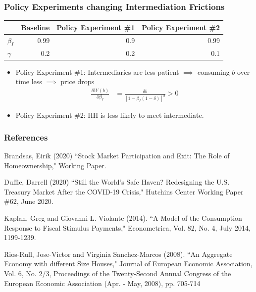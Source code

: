 \documentclass{beamer}
\begin{document}
\begin{frame}
\frametitle{Policy Experiments changing Intermediation Frictions}

\begin{center}
\begin{tabular}{ l | r r r }
& Baseline & Policy Experiment \#1 & Policy Experiment \#2\\ 
\hline 
$\beta_I$ & 0.99 & 0.9 & 0.99 \\
$\gamma$  & 0.2 & 0.2 & 0.1 \\ 
\end{tabular}
\end{center}

\bigskip


\begin{itemize}[<+->]
\item Policy Experiment \#1: Intermediaries are less patient $\implies$ consuming $b$ over time less $\implies$ price drops
\begin{align*}
\frac{\partial W(b)}{\partial \beta_I} &= \frac{\delta b }{[1 - \beta_I (1-\delta)]^2} > 0
\end{align*}
\bigskip
\item Policy Experiment \#2: HH is less likely to meet intermediate.
\end{itemize}


\end{frame}




\begin{frame}
\frametitle{References}
\scriptsize

Brandsas, Eirik (2020) ``Stock Market Participation and Exit: The Role of Homeownership," Working Paper.

\smallskip

Duffie, Darrell (2020) ``Still the World's Safe Haven? Redesigning the U.S. Treasury Market After the COVID-19 Crisis," Hutchins Center Working Paper \#62, June 2020.

\smallskip

Kaplan, Greg and Giovanni L. Violante (2014). ``A Model of the Consumption Response to Fiscal Stimulus Payments," Econometrica, Vol. 82, No. 4, July 2014, 1199-1239.

\smallskip

Rios-Rull, Jose-Victor and Virginia Sanchez-Marcos (2008). ``An Aggregate Economy with different Size Houses," Journal of European Economic Association, Vol. 6, No. 2/3, Proceedings of the Twenty-Second Annual Congress of the European Economic Association (Apr. - May, 2008), pp. 705-714

\end{frame}
\end{document}
